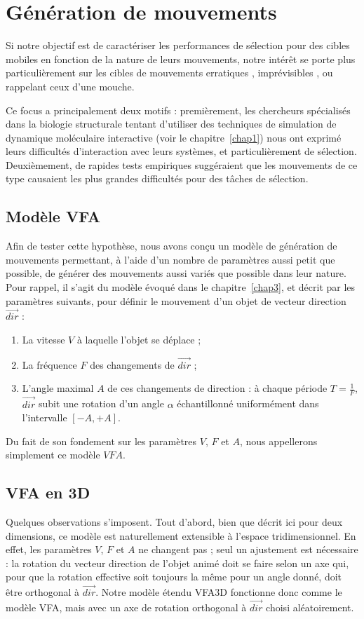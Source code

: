 \section{Génération de mouvements}
	Si notre objectif est de caractériser les performances de sélection pour des cibles mobiles en fonction de la nature de leurs mouvements, notre intérêt se porte plus particulièrement sur les cibles de mouvements \og erratiques \fg{}, \og imprévisibles \fg{}, ou rappelant ceux d'une mouche.
	
	Ce focus a principalement deux motifs : premièrement, les chercheurs spécialisés dans la biologie structurale tentant d'utiliser des techniques de simulation de dynamique moléculaire interactive (voir le chapitre~\ref{chap1}) nous ont exprimé leurs difficultés d'interaction avec leurs systèmes, et particulièrement de sélection. Deuxièmement, de rapides tests empiriques suggéraient que les mouvements de ce type causaient les plus grandes difficultés pour des tâches de sélection.
	
	\subsection{Modèle VFA}
	Afin de tester cette hypothèse, nous avons conçu un modèle de génération de mouvements permettant, à l'aide d'un nombre de paramètres aussi petit que possible, de générer des mouvements aussi variés que possible dans leur nature. Pour rappel, il s'agit du modèle évoqué dans le chapitre~\ref{chap3}, et décrit par les paramètres suivants, pour définir le mouvement d'un objet de vecteur direction $\vec{dir}$ :
	
    \begin{enumerate}
    	\item La vitesse $V$ à laquelle l'objet se déplace ;
    	\item La fréquence $F$ des changements de $\vec{dir}$ ;
    	\item L'angle maximal $A$ de ces changements de direction : à chaque période $T = \frac{1}{F}$, $\vec{dir}$ subit une rotation d'un angle $\alpha$ échantillonné uniformément dans l'intervalle $[-A, +A]$.
    \end{enumerate}
    
    Du fait de son fondement sur les paramètres $V$, $F$ et $A$, nous appellerons simplement ce modèle $VFA$.
    
    \subsection{VFA en 3D}
    Quelques observations s'imposent. Tout d'abord, bien que décrit ici pour deux dimensions, ce modèle est naturellement extensible à l'espace tridimensionnel. En effet, les paramètres $V$, $F$ et $A$ ne changent pas ; seul un ajustement est nécessaire : la rotation du vecteur direction de l'objet animé doit se faire selon un axe qui, pour que la rotation effective soit toujours la même pour un angle donné, doit être orthogonal à $\vec{dir}$. Notre modèle étendu VFA3D fonctionne donc comme le modèle VFA, mais avec un axe de rotation orthogonal à $\vec{dir}$ choisi aléatoirement.
    
